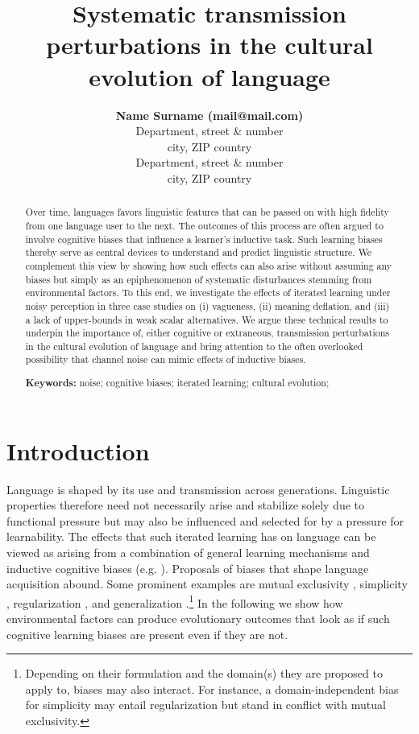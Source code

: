 \documentclass[10pt,a4paper]{article}
\title{Systematic transmission perturbations in the cultural evolution of language}
\author{{\large \bf Name Surname (mail@mail.com)} \\
  Department, street \& number \\
  city, ZIP country
  \AND {\large \bf Name Surname (mail@mail.com)} \\
  Department, street \& number \\
  city, ZIP country}
\begin{document}
\maketitle

\begin{abstract}
Over time, languages favors linguistic features that can be passed on with high fidelity from one language user to the next. The outcomes of this process are often argued to involve cognitive biases that influence a learner's inductive task. Such learning biases thereby serve as central devices to understand and predict linguistic structure. We complement this view by showing how such effects can also arise without assuming any biases but simply as an epiphenomenon of systematic disturbances stemming from environmental factors. To this end, we investigate the effects of iterated learning under noisy perception in three case studies on (i) vagueness, (ii) meaning deflation, and (iii) a lack of upper-bounds in weak scalar alternatives. We argue these technical results to underpin the importance of, either cognitive or extraneous, transmission perturbations in the cultural evolution of language and bring attention to the often overlooked possibility that channel noise can mimic effects of inductive biases.

\textbf{Keywords:} 
noise; cognitive biases; iterated learning; cultural evolution;  
\end{abstract}
\section{Introduction}
Language is shaped by its use and transmission across generations. Linguistic properties therefore need not necessarily arise and stabilize solely due to functional pressure but may also be influenced and selected for by a pressure for learnability. The effects that such iterated learning has on language can be viewed as arising from a combination of general learning mechanisms and inductive cognitive biases (e.g. \citealt{griffiths+kalish:2007,kirby+etal:2014,tamariz+kirby:2016}). Proposals of biases that shape language acquisition abound. Some prominent examples are mutual exclusivity \citep{merriman+bowman:1989,clark:2009}, simplicity \citep{kirby+etal:2015}, regularization \citep{hudson+etal:2005}, and generalization \citep{smith:2011,oconnor:2015}.\footnote{Depending on their formulation and the domain(s) they are proposed to apply to, biases may also interact. For instance, a domain-independent bias for simplicity may entail regularization but stand in conflict with mutual exclusivity.} In the following we show how environmental factors can produce evolutionary outcomes that look as if such cognitive learning biases are present even if they are not.
\end{document}
